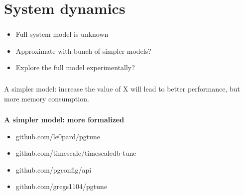 \documentclass[usenames,dvipsnames, 18pt, compress, aspectratio=169]{beamer}
\begin{document}
\section{System dynamics}

\begin{frame}[fragile]{}
    \frametitle{}
    \begin{center}

        \begin{itemize}
            \item Full system model is unknown
            \item Approximate with bunch of simpler models?
            \item Explore the full model experimentally?
        \end{itemize}

    \end{center}
\end{frame}

\begin{frame}[fragile]{}
    \frametitle{}
    \begin{flushleft}

        A simpler model: increase the value of X will lead to better
        performance, but more memory consumption.

    \end{flushleft}
\end{frame}

\begin{frame}[fragile]{}
    \frametitle{}
    \begin{center}

        \textbf{A simpler model: more formalized}

        \vspace{0.5cm}
        \begin{itemize}
            \item github.com/le0pard/pgtune
            \item github.com/timescale/timescaledb-tune
            \item github.com/pgconfig/api
            \item github.com/gregs1104/pgtune
        \end{itemize}

    \end{center}
\end{frame}
\end{document}
